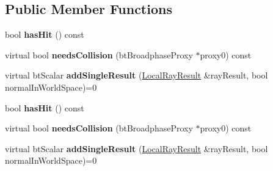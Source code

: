 \subsection*{Public Member Functions}
\begin{DoxyCompactItemize}
\item 
\mbox{\label{structbtCollisionWorld_1_1RayResultCallback_aaf9869fa287538602bc3c44bff355586}} 
bool {\bfseries has\+Hit} () const
\item 
\mbox{\label{structbtCollisionWorld_1_1RayResultCallback_a30b3f98ab78a1436f2907f39571302c5}} 
virtual bool {\bfseries needs\+Collision} (bt\+Broadphase\+Proxy $\ast$proxy0) const
\item 
\mbox{\label{structbtCollisionWorld_1_1RayResultCallback_a86c0f8b2333cc3460b37aa679f5c3b44}} 
virtual bt\+Scalar {\bfseries add\+Single\+Result} (\hyperlink{structbtCollisionWorld_1_1LocalRayResult}{Local\+Ray\+Result} \&ray\+Result, bool normal\+In\+World\+Space)=0
\item 
\mbox{\label{structbtCollisionWorld_1_1RayResultCallback_aaf9869fa287538602bc3c44bff355586}} 
bool {\bfseries has\+Hit} () const
\item 
\mbox{\label{structbtCollisionWorld_1_1RayResultCallback_a30b3f98ab78a1436f2907f39571302c5}} 
virtual bool {\bfseries needs\+Collision} (bt\+Broadphase\+Proxy $\ast$proxy0) const
\item 
\mbox{\label{structbtCollisionWorld_1_1RayResultCallback_a86c0f8b2333cc3460b37aa679f5c3b44}} 
virtual bt\+Scalar {\bfseries add\+Single\+Result} (\hyperlink{structbtCollisionWorld_1_1LocalRayResult}{Local\+Ray\+Result} \&ray\+Result, bool normal\+In\+World\+Space)=0
\end{DoxyCompactItemize}
